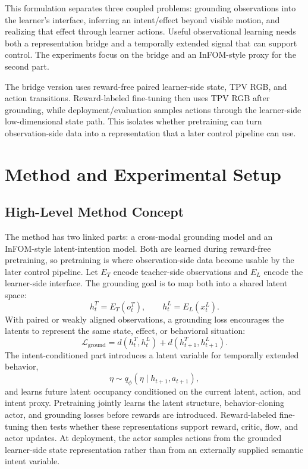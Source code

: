 \documentclass{article}
\begin{document}
This formulation separates three coupled problems: grounding observations into the learner's interface, inferring an intent/effect beyond visible motion, and realizing that effect through learner actions. Useful observational learning needs both a representation bridge and a temporally extended signal that can support control. The experiments focus on the bridge and an InFOM-style proxy for the second part.

The bridge version uses reward-free paired learner-side state, TPV RGB, and action transitions. Reward-labeled fine-tuning then uses TPV RGB after grounding, while deployment/evaluation samples actions through the learner-side low-dimensional state path. This isolates whether pretraining can turn observation-side data into a representation that a later control pipeline can use.

\section{Method and Experimental Setup}

\subsection{High-Level Method Concept}

The method has two linked parts: a cross-modal grounding model and an InFOM-style latent-intention model. Both are learned during reward-free pretraining, so pretraining is where observation-side data become usable by the later control pipeline. Let $E_T$ encode teacher-side observations and $E_L$ encode the learner-side interface. The grounding goal is to map both into a shared latent space:
\begin{equation}
    h^T_t = E_T(o^T_t), \qquad h^L_t = E_L(x^L_t).
\end{equation}
With paired or weakly aligned observations, a grounding loss encourages the latents to represent the same state, effect, or behavioral situation:
\begin{equation}
    \mathcal{L}_{\mathrm{ground}} =
    d(h^T_t, h^L_t) + d(h^T_{t+1}, h^L_{t+1}).
\end{equation}
The intent-conditioned part introduces a latent variable for temporally extended behavior,
\begin{equation}
    \eta \sim q_\phi(\eta \mid h_{t+1}, a_{t+1}),
\end{equation}
and learns future latent occupancy conditioned on the current latent, action, and intent proxy. Pretraining jointly learns the latent structure, behavior-cloning actor, and grounding losses before rewards are introduced. Reward-labeled fine-tuning then tests whether these representations support reward, critic, flow, and actor updates. At deployment, the actor samples actions from the grounded learner-side state representation rather than from an externally supplied semantic intent variable.
\end{document}
